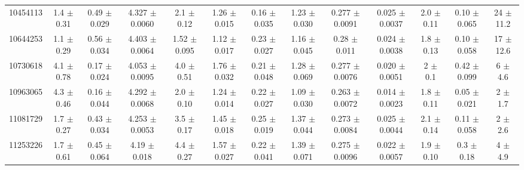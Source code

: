 \begin{table}[H]
\begin{tabular}{c|cccccc|cccccc}
10454113 &        1.4    $\pm$  0.31   &      0.49   $\pm$  0.029  &      4.327  $\pm$  0.0060 &      2.1    $\pm$  0.12   &      1.26   $\pm$  0.015  &      0.16   $\pm$  0.035    &        1.23   $\pm$  0.030    &        0.277  $\pm$  0.0091   &        0.025  $\pm$  0.0037   &        2.0    $\pm$  0.11     &        0.10   $\pm$  0.065    &       24      $\pm$  11.2     \\
10644253 &        1.1    $\pm$  0.29   &      0.56   $\pm$  0.034  &      4.403  $\pm$  0.0064 &      1.52   $\pm$  0.095  &      1.12   $\pm$  0.017  &      0.23   $\pm$  0.027    &        1.16   $\pm$  0.045    &        0.28   $\pm$  0.011    &        0.024  $\pm$  0.0038   &        1.8    $\pm$  0.13     &        0.10   $\pm$  0.058    &       17      $\pm$  12.6     \\
10730618 &        4.1    $\pm$  0.78   &      0.17   $\pm$  0.024  &      4.053  $\pm$  0.0095 &      4.0    $\pm$  0.51   &      1.76   $\pm$  0.032  &      0.21   $\pm$  0.048    &        1.28   $\pm$  0.069    &        0.277  $\pm$  0.0076   &        0.020  $\pm$  0.0051   &        2      $\pm$  0.1      &        0.42   $\pm$  0.099    &        6      $\pm$  4.6      \\
10963065 &        4.3    $\pm$  0.46   &      0.16   $\pm$  0.044  &      4.292  $\pm$  0.0068 &      2.0    $\pm$  0.10   &      1.24   $\pm$  0.014  &      0.22   $\pm$  0.027    &        1.09   $\pm$  0.030    &        0.263  $\pm$  0.0072   &        0.014  $\pm$  0.0023   &        1.8    $\pm$  0.11     &        0.05   $\pm$  0.021    &        2      $\pm$  1.7      \\
11081729 &        1.7    $\pm$  0.27   &      0.43   $\pm$  0.034  &      4.253  $\pm$  0.0053 &      3.5    $\pm$  0.17   &      1.45   $\pm$  0.018  &      0.25   $\pm$  0.019    &        1.37   $\pm$  0.044    &        0.273  $\pm$  0.0084   &        0.025  $\pm$  0.0044   &        2.1    $\pm$  0.14     &        0.11   $\pm$  0.058    &        2      $\pm$  2.6      \\
11253226 &        1.7    $\pm$  0.61   &      0.45   $\pm$  0.064  &      4.19   $\pm$  0.018  &      4.4    $\pm$  0.27   &      1.57   $\pm$  0.027  &      0.22   $\pm$  0.041    &        1.39   $\pm$  0.071    &        0.275  $\pm$  0.0096   &        0.022  $\pm$  0.0057   &        1.9    $\pm$  0.10     &        0.3    $\pm$  0.18     &        4      $\pm$  4.9      \\

\end{tabular}
\end{table}

